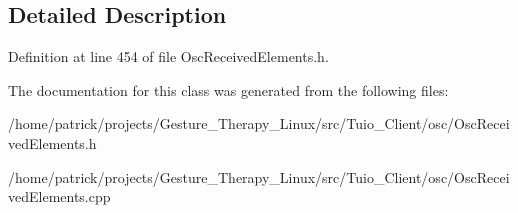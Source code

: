 \subsection{Detailed Description}


Definition at line 454 of file Osc\+Received\+Elements.\+h.



The documentation for this class was generated from the following files\+:\begin{DoxyCompactItemize}
\item 
/home/patrick/projects/\+Gesture\+\_\+\+Therapy\+\_\+\+Linux/src/\+Tuio\+\_\+\+Client/osc/Osc\+Received\+Elements.\+h\item 
/home/patrick/projects/\+Gesture\+\_\+\+Therapy\+\_\+\+Linux/src/\+Tuio\+\_\+\+Client/osc/Osc\+Received\+Elements.\+cpp\end{DoxyCompactItemize}
